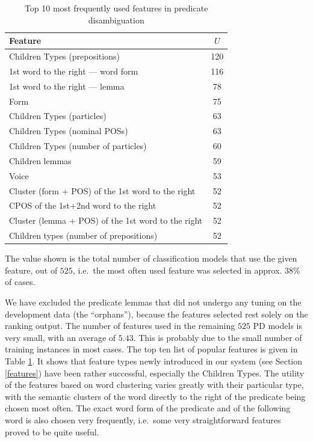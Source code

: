 \documentclass[12pt,notitlepage]{report}
\begin{document}
\begin{table}[htb]\footnotesize
\caption{Top 10 most frequently used features in predicate disambiguation}\label{tab:feats-pd}
\begin{center}
\begin{tabular}{|l|c|}\hline
\bf Feature & \bf $U$ \\\hline
Children Types (prepositions) & 120 \\
1st word to the right --- word form & 116 \\
1st word to the right --- lemma & 78 \\
Form & 75 \\
Children Types (particles) & 63 \\
Children Types (nominal POSs) & 63 \\
Children Types (number of particles) & 60 \\
Children lemmas & 59 \\
Voice & 53 \\
Cluster (form + POS) of the 1st word to the right & 52 \\
CPOS of the 1st+2nd word to the right & 52 \\
Cluster (lemma + POS) of the 1st word to the right & 52 \\
Children types (number of prepositions) & 52 \\\hline
\end{tabular}
\end{center}
The value shown is the total number of classification models that use the given feature, out of $525$, i.e.\ the most often used feature was selected in approx. 38\% of cases.
\end{table}

We have excluded the predicate lemmas that did not undergo any tuning on the development data (the ``orphans''), because the features selected rest solely on the ranking output. The number of features used in the remaining $525$ PD models is very small, with an average of $5.43$. This is probably due to the small number of training instances in most cases. The top ten list of popular features is given in Table \ref{tab:feats-pd}. It shows that feature types newly introduced in our system (see Section \ref{features}) have been rather successful, especially the Children Types. The utility of the features based on word clustering varies greatly with their particular type, with the semantic clusters of the word directly to the right of the predicate being chosen most often. The exact word form of the predicate and of the following word is also chosen very frequently, i.e.\ some very straightforward features proved to be quite useful.
\end{document}
